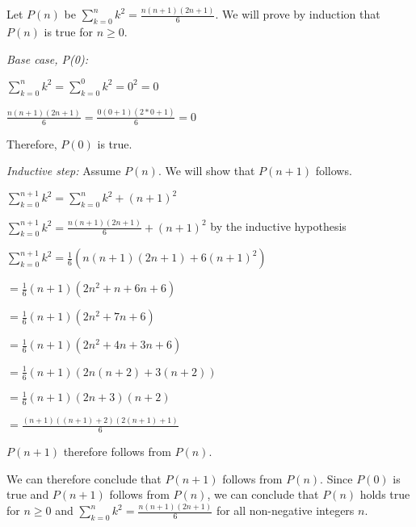 \documentclass[solution, letterpaper]{cs20inclass}
\begin{document}
\begin{solution}

Let $P(n)$ be $\sum_{k=0}^{n}k^{2}=\frac{n(n+1)(2n+1)}{6}$. We will prove by induction that $P(n)$ is true for $n\geq0$.

\textit{Base case, P(0):} 

$\sum_{k=0}^{n}k^{2}=\sum_{k=0}^{0}k^{2}= 0^2 = 0$

$\frac{n(n+1)(2n+1)}{6}=\frac{0(0+1)(2*0+1)}{6}=0$

Therefore, $P(0)$ is true.

\textit{Inductive step:} Assume $P(n)$. We will show that $P(n+1)$ follows.

$\sum_{k=0}^{n+1}k^{2} = \sum_{k=0}^{n}k^{2} + (n+1)^2$

$\sum_{k=0}^{n+1}k^{2} = \frac{n(n+1)(2n+1)}{6} + (n+1)^2$ by the inductive hypothesis

$\sum_{k=0}^{n+1}k^{2} = \frac{1}{6} (n(n+1)(2n+1) + 6(n+1)^2)$

\hspace{1.6cm}$ = \frac{1}{6} (n+1)(2n^2+n+6n+6)$

\hspace{1.6cm}$ = \frac{1}{6} (n+1)(2n^2+7n+6)$

\hspace{1.6cm}$ = \frac{1}{6} (n+1)(2n^2+4n+3n+6)$

\hspace{1.6cm}$ = \frac{1}{6} (n+1)(2n(n+2)+3(n+2))$

\hspace{1.6cm}$ = \frac{1}{6} (n+1)(2n+3)(n+2)$

\hspace{1.6cm}$ = \frac{(n+1)((n+1)+2)(2(n+1)+1)}{6}$

$P(n+1)$ therefore follows from $P(n)$.

We can therefore conclude that $P(n+1)$ follows from $P(n)$. Since $P(0)$ is true and $P(n+1)$ follows from $P(n)$, we can conclude that $P(n)$ holds true for $n \geq 0$ and $\sum_{k=0}^{n}k^{2}=\frac{n(n+1)(2n+1)}{6}$ for all non-negative integers $n$.

\end{solution}
\end{document}
